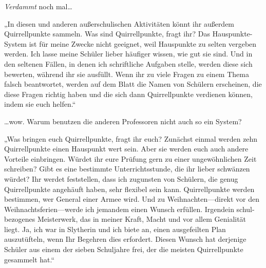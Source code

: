 \emph{Verdammt} noch mal…

„In diesen und anderen außerschulischen Aktivitäten könnt ihr außerdem Quirrellpunkte sammeln. Was sind Quirrellpunkte, fragt ihr? Das Hauspunkte-System ist für meine Zwecke nicht geeignet, weil Hauspunkte zu selten vergeben werden. Ich lasse meine Schüler lieber häufiger wissen, wie gut sie sind. Und in den seltenen Fällen, in denen ich schriftliche Aufgaben stelle, werden diese sich bewerten, während ihr sie ausfüllt. Wenn ihr zu viele Fragen zu einem Thema falsch beantwortet, werden auf dem Blatt die Namen von Schülern erscheinen, die diese Fragen richtig haben und die sich dann Quirrellpunkte verdienen können, indem sie euch helfen.“

…wow. Warum benutzen die anderen Professoren nicht auch so ein System?

„Was bringen euch Quirrellpunkte, fragt ihr euch? Zunächst einmal werden zehn Quirrellpunkte einen Hauspunkt wert sein. Aber sie werden euch auch andere Vorteile einbringen. Würdet ihr eure Prüfung gern zu einer ungewöhnlichen Zeit schreiben? Gibt es eine bestimmte Unterrichtsstunde, die ihr lieber schwänzen würdet? Ihr werdet feststellen, dass ich zugunsten von Schülern, die genug Quirrellpunkte angehäuft haben, sehr flexibel sein kann. Quirrellpunkte werden bestimmen, wer General einer Armee wird. Und zu Weihnachten—direkt vor den Weihnachtsferien—werde ich jemandem einen Wunsch erfüllen. Irgendein schul-bezogenes Meisterwerk, das in meiner Kraft, Macht und vor allem Genialität liegt. Ja, ich war in Slytherin und ich biete an, einen ausgefeilten Plan auszutüfteln, wenn Ihr Begehren dies erfordert. Diesen Wunsch hat derjenige Schüler aus einem der sieben Schuljahre frei, der die meisten Quirrellpunkte gesammelt hat.“

